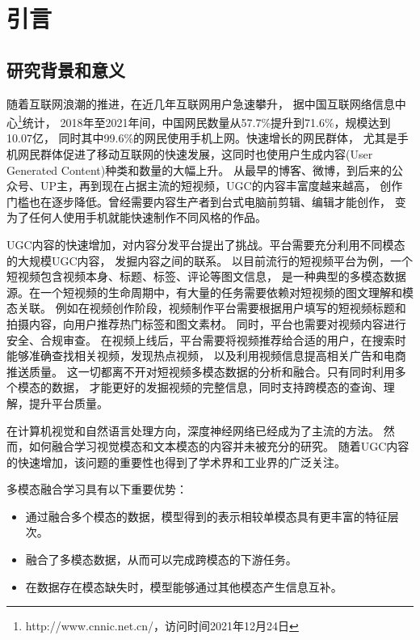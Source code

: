 
\chapter{引言}\label{chap:introduction}

\section{研究背景和意义}\label{sec:background}

随着互联网浪潮的推进，在近几年互联网用户急速攀升，
据中国互联网络信息中心\footnote{http://www.cnnic.net.cn/，访问时间2021年12月24日}统计，
2018年至2021年间，中国网民数量从57.7\%提升到71.6\%，规模达到10.07亿，
同时其中99.6\%的网民使用手机上网。快速增长的网民群体，
尤其是手机网民群体促进了移动互联网的快速发展，这同时也使用户生成内容(User Generated Content)种类和数量的大幅上升。
从最早的博客、微博，到后来的公众号、UP主，再到现在占据主流的短视频，UGC的内容丰富度越来越高，
创作门槛也在逐步降低。曾经需要内容生产者到台式电脑前剪辑、编辑才能创作，
变为了任何人使用手机就能快速制作不同风格的作品。

UGC内容的快速增加，对内容分发平台提出了挑战。平台需要充分利用不同模态的大规模UGC内容，
发掘内容之间的联系。
以目前流行的短视频平台为例，一个短视频包含视频本身、标题、标签、评论等图文信息，
是一种典型的多模态数据源。在一个短视频的生命周期中，有大量的任务需要依赖对短视频的图文理解和模态关联。
例如在视频创作阶段，视频制作平台需要根据用户填写的短视频标题和拍摄内容，向用户推荐热门标签和图文素材。
同时，平台也需要对视频内容进行安全、合规审查。
在视频上线后，平台需要将视频推荐给合适的用户，在搜索时能够准确查找相关视频，发现热点视频，
以及利用视频信息提高相关广告和电商推送质量。
这一切都离不开对短视频多模态数据的分析和融合。只有同时利用多个模态的数据，
才能更好的发掘视频的完整信息，同时支持跨模态的查询、理解，提升平台质量。

在计算机视觉和自然语言处理方向，深度神经网络已经成为了主流的方法。
然而，如何融合学习视觉模态和文本模态的内容并未被充分的研究。
随着UGC内容的快速增加，该问题的重要性也得到了学术界和工业界的广泛关注。

多模态融合学习具有以下重要优势：

\begin{itemize}
    \item 通过融合多个模态的数据，模型得到的表示相较单模态具有更丰富的特征层次。
    \item 融合了多模态数据，从而可以完成跨模态的下游任务。
    \item 在数据存在模态缺失时，模型能够通过其他模态产生信息互补。
\end{itemize}

